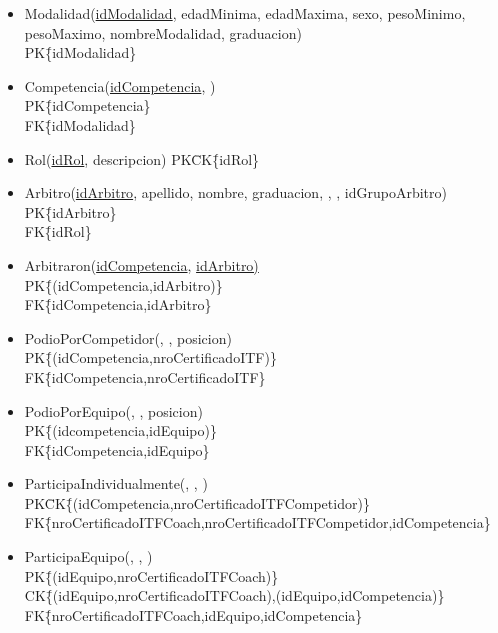 \begin{itemize}
\item{Modalidad(\underline{idModalidad}, edadMinima, edadMaxima, sexo, pesoMinimo, pesoMaximo, nombreModalidad, graduacion) \\
PK\=\{idModalidad\}
}

\item{Competencia(\underline{idCompetencia}, ) \\
PK\=\{idCompetencia\}\\
FK\=\{idModalidad\}
}

\item{Rol(\underline{idRol}, descripcion)
PK\=CK\=\{idRol\}
}

\item{Arbitro(\underline{idArbitro}, apellido, nombre, graduacion, , , idGrupoArbitro)\\
PK\=\{idArbitro\}\\
FK\=\{idRol\}
}

\item{Arbitraron(\underline{idCompetencia}, \underline{idArbitro)} \\
PK\= \{(idCompetencia,idArbitro)\}\\
FK\=\{idCompetencia,idArbitro\}
}

\item{PodioPorCompetidor(\underline{}, \underline{}, posicion) \\
PK\= \{(idCompetencia,nroCertificadoITF)\}\\
FK\=\{idCompetencia,nroCertificadoITF\}
}

\item{PodioPorEquipo(\underline{}, \underline{}, posicion) \\
PK\= \{(idcompetencia,idEquipo)\}\\
FK\=\{idCompetencia,idEquipo\}
}

\item{ParticipaIndividualmente(\underline{}, \underline{}, )\\
PK\=CK\= \{(idCompetencia,nroCertificadoITFCompetidor)\}\\
FK\=\{nroCertificadoITFCoach,nroCertificadoITFCompetidor,idCompetencia\}
}

\item{ParticipaEquipo(, , \underline{})\\
PK\= \{(idEquipo,nroCertificadoITFCoach)\}\\
CK\= \{(idEquipo,nroCertificadoITFCoach),(idEquipo,idCompetencia)\}\\
FK\=\{nroCertificadoITFCoach,idEquipo,idCompetencia\}
}

\end{itemize}

